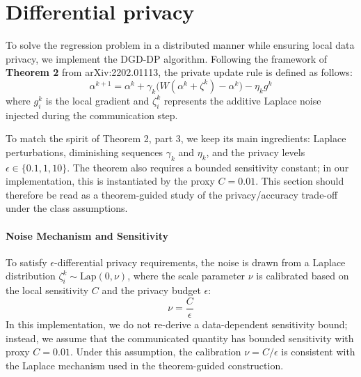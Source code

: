 \documentclass[11pt,a4paper]{article}
\begin{document}
\section{Differential privacy}

To solve the regression problem in a distributed manner while ensuring local data privacy, we implement the DGD-DP algorithm. Following the framework of \textbf{Theorem 2} from arXiv:2202.01113, the private update rule is defined as follows:
\[
\alpha^{k+1} = \alpha^k + \gamma_k \bigl( W(\alpha^k + \zeta^k) - \alpha^k \bigr) - \eta_k g^k
\]
where $g_i^k$ is the local gradient and $\zeta_i^k$ represents the additive Laplace noise injected during the communication step.

To match the spirit of Theorem 2, part 3, we keep its main ingredients: Laplace perturbations, diminishing sequences \(\gamma_k\) and \(\eta_k\), and the privacy levels \(\epsilon\in\{0.1,1,10\}\). The theorem also requires a bounded sensitivity constant; in our implementation, this is instantiated by the proxy \(C=0.01\). This section should therefore be read as a theorem-guided study of the privacy/accuracy trade-off under the class assumptions.

\paragraph{Noise Mechanism and Sensitivity}
To satisfy $\epsilon$-differential privacy requirements, the noise is drawn from a Laplace distribution $\zeta_i^k \sim \text{Lap}(0, \nu)$, where the scale parameter $\nu$ is calibrated based on the local sensitivity $C$ and the privacy budget $\epsilon$:
\[
\nu = \frac{C}{\epsilon}
\]
In this implementation, we do not re-derive a data-dependent sensitivity bound; instead, we assume that the communicated quantity has bounded sensitivity with proxy $C = 0.01$. Under this assumption, the calibration \(\nu=C/\epsilon\) is consistent with the Laplace mechanism used in the theorem-guided construction.
\end{document}

